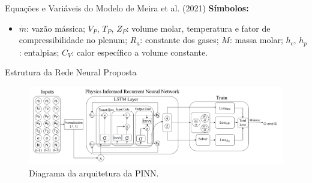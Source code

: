\begin{frame}{Equações e Variáveis do Modelo de Meira et al. (2021)}
    \vspace{0.2cm}
    \textbf{Símbolos:}
    \begin{itemize}
        \item \( \dot{m} \): vazão mássica; 
        \( V_P \), \( T_P \), \( Z_P \): volume molar, temperatura e fator de compressibilidade no plenum;
        \( R_a \): constante dos gases; 
        \( M \): massa molar; 
        \( h_c \), \( h_p \): entalpias; 
        \( C_V \): calor específico a volume constante.
    \end{itemize}
\end{frame}

\begin{frame}{Estrutura da Rede Neural Proposta}
    \vspace{-0.3cm}
    \begin{figure}
        \centering
        \includegraphics[width=1.0\textwidth]{figures/PIRNN.png} %
        \caption{\small Diagrama da arquitetura da PINN.}
    \end{figure}
\end{frame}
